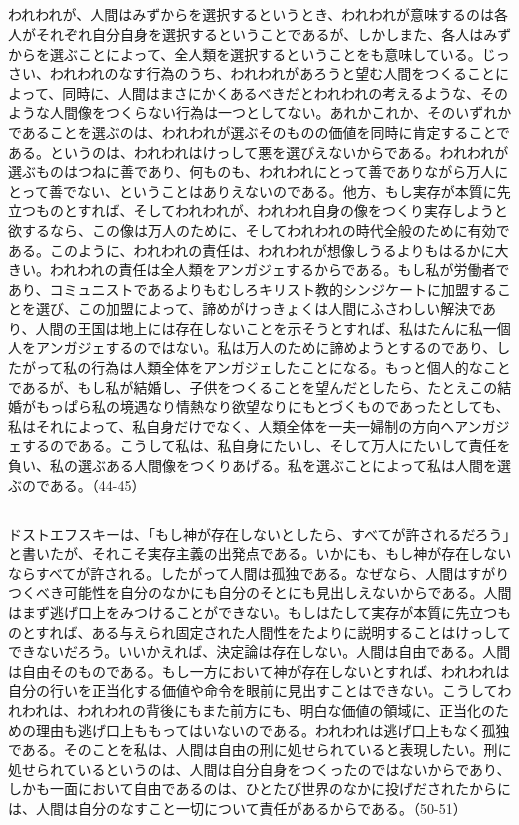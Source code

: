 \subsection{}

われわれが、人間はみずからを選択するというとき、われわれが意味するのは各人がそれぞれ自分自身を選択するということであるが、しかしまた、各人はみずからを選ぶことによって、全人類を選択するということをも意味している。じっさい、われわれのなす行為のうち、われわれがあろうと望む人間をつくることによって、同時に、人間はまさにかくあるべきだとわれわれの考えるような、そのような人間像をつくらない行為は一つとしてない。あれかこれか、そのいずれかであることを選ぶのは、われわれが選ぶそのものの価値を同時に肯定することである。というのは、われわれはけっして悪を選びえないからである。われわれが選ぶものはつねに善であり、何ものも、われわれにとって善でありながら万人にとって善でない、ということはありえないのである。他方、もし実存が本質に先立つものとすれば、そしてわれわれが、われわれ自身の像をつくり実存しようと欲するなら、この像は万人のために、そしてわれわれの時代全般のために有効である。このように、われわれの責任は、われわれが想像しうるよりもはるかに大きい。われわれの責任は全人類をアンガジェするからである。もし私が労働者であり、コミュニストであるよりもむしろキリスト教的シンジケートに加盟することを選び、この加盟によって、諦めがけっきょくは人間にふさわしい解決であり、人間の王国は地上には存在しないことを示そうとすれば、私はたんに私一個人をアンガジェするのではない。私は万人のために諦めようとするのであり、したがって私の行為は人類全体をアンガジェしたことになる。もっと個人的なことであるが、もし私が結婚し、子供をつくることを望んだとしたら、たとえこの結婚がもっぱら私の境遇なり情熱なり欲望なりにもとづくものであったとしても、私はそれによって、私自身だけでなく、人類全体を一夫一婦制の方向へアンガジェするのである。こうして私は、私自身にたいし、そして万人にたいして責任を負い、私の選ぶある人間像をつくりあげる。私を選ぶことによって私は人間を選ぶのである。（44-45）

\subsection{}


ドストエフスキーは、「もし神が存在しないとしたら、すべてが許されるだろう」と書いたが、それこそ実存主義の出発点である。いかにも、もし神が存在しないならすべてが許される。したがって人間は孤独である。なぜなら、人間はすがりつくべき可能性を自分のなかにも自分のそとにも見出しえないからである。人間はまず逃げ口上をみつけることができない。もしはたして実存が本質に先立つものとすれば、ある与えられ固定された人間性をたよりに説明することはけっしてできないだろう。いいかえれば、決定論は存在しない。人間は自由である。人間は自由そのものである。もし一方において神が存在しないとすれば、われわれは自分の行いを正当化する価値や命令を眼前に見出すことはできない。こうしてわれわれは、われわれの背後にもまた前方にも、明白な価値の領域に、正当化のための理由も逃げ口上ももってはいないのである。われわれは逃げ口上もなく孤独である。そのことを私は、人間は自由の刑に処せられていると表現したい。刑に処せられているというのは、人間は自分自身をつくったのではないからであり、しかも一面において自由であるのは、ひとたび世界のなかに投げだされたからには、人間は自分のなすこと一切について責任があるからである。（50-51）

